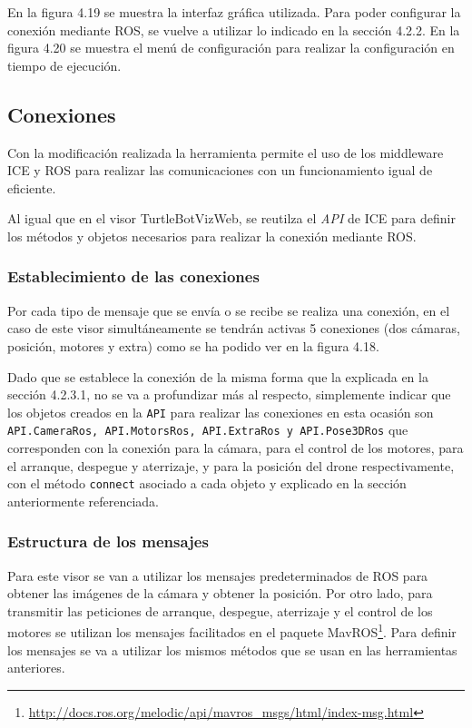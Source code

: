 En la figura 4.19 se muestra la interfaz gráfica utilizada. Para poder configurar la conexión mediante ROS, se vuelve a utilizar lo indicado en la sección 4.2.2. En la figura 4.20 se muestra el menú de configuración para realizar la configuración en tiempo de ejecución.

\subsection{Conexiones}

Con la modificación realizada la herramienta permite el uso de los middleware ICE y ROS para realizar las comunicaciones con un funcionamiento igual de eficiente.

Al igual que en el visor TurtleBotVizWeb, se reutilza el \textit{API} de ICE para definir los métodos y objetos necesarios para realizar la conexión mediante ROS.

\subsubsection{Establecimiento de las conexiones}

Por cada tipo de mensaje que se envía o se recibe se realiza una conexión, en el caso de este visor simultáneamente se tendrán activas 5 conexiones (dos cámaras, posición, motores y extra) como se ha podido ver en la figura 4.18.

Dado que se establece la conexión de la misma forma que la explicada en la sección 4.2.3.1, no se va a profundizar más al respecto, simplemente indicar que los objetos creados en la \texttt{API} para realizar las conexiones en esta ocasión son \texttt{API.CameraRos, API.MotorsRos, API.ExtraRos y API.Pose3DRos} que corresponden con la conexión para la cámara, para el control de los motores, para el arranque, despegue y aterrizaje, y para la posición del drone respectivamente, con el método \texttt{connect} asociado a cada objeto y explicado en la sección anteriormente referenciada.

\subsubsection{Estructura de los mensajes}

Para este visor se van a utilizar los mensajes predeterminados de ROS para obtener las imágenes de la cámara y obtener la posición. Por otro lado, para transmitir las peticiones de arranque, despegue, aterrizaje y el control de los motores se utilizan los mensajes facilitados en el paquete MavROS\footnote{\url{http://docs.ros.org/melodic/api/mavros_msgs/html/index-msg.html}}. Para definir los mensajes se va a utilizar los mismos métodos que se usan en las herramientas anteriores.

